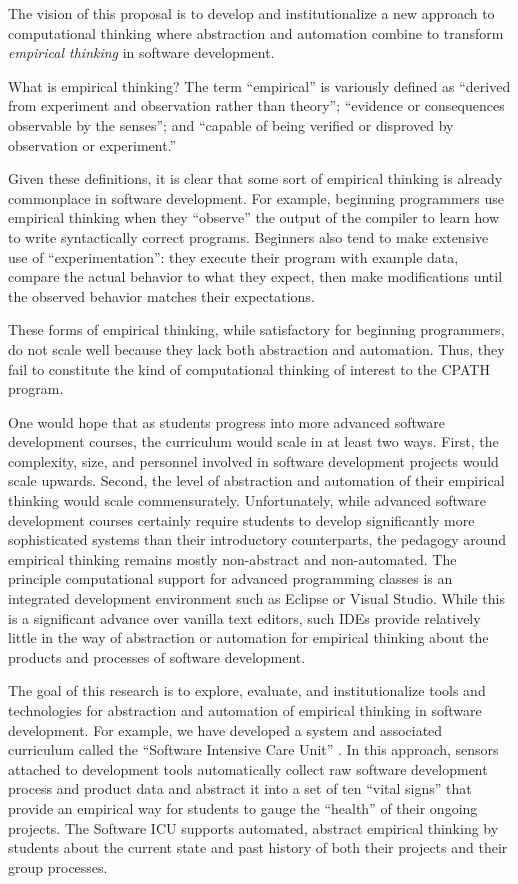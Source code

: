 The vision of this proposal is to develop and institutionalize a new
approach to computational thinking where abstraction and automation combine
to transform {\em empirical thinking} in software development.

What is empirical thinking?  The term ``empirical'' is variously defined as
``derived from experiment and observation rather than theory''; ``evidence
or consequences observable by the senses''; and ``capable of being verified
or disproved by observation or experiment.''

Given these definitions, it is clear that some sort of empirical thinking
is already commonplace in software development.  For example, beginning
programmers use empirical thinking when they ``observe'' the output of the
compiler to learn how to write syntactically correct programs.  Beginners
also tend to make extensive use of ``experimentation'': they execute their
program with example data, compare the actual behavior to what they expect,
then make modifications until the observed behavior matches their
expectations.

These forms of empirical thinking, while satisfactory for beginning
programmers, do not scale well because they lack both abstraction and
automation. Thus, they fail to constitute the kind of computational
thinking of interest to the CPATH program.

One would hope that as students progress into more advanced software
development courses, the curriculum would scale in at least two
ways. First, the complexity, size, and personnel involved in software
development projects would scale upwards.  Second, the level of abstraction
and automation of their empirical thinking would scale
commensurately. Unfortunately, while advanced software development courses
certainly require students to develop significantly more sophisticated
systems than their introductory counterparts, the pedagogy around empirical
thinking remains mostly non-abstract and non-automated.  The principle
computational support for advanced programming classes is an integrated
development environment such as Eclipse or Visual Studio. While this is a
significant advance over vanilla text editors, such IDEs provide relatively
little in the way of abstraction or automation for empirical thinking about
the products and processes of software development.

The goal of this research is to explore, evaluate, and institutionalize
tools and technologies for abstraction and automation of empirical thinking
in software development.  For example, we have developed a
system and associated curriculum called the ``Software Intensive Care
Unit'' \citep{csdl2-09-02}.  In this approach, sensors attached to
development tools automatically collect raw software development process
and product data and abstract it into a set of ten ``vital signs'' that
provide an empirical way for students to gauge the ``health'' of their
ongoing projects.  The Software ICU supports automated, abstract empirical
thinking by students about the current state and past history of both their
projects and their group processes.


